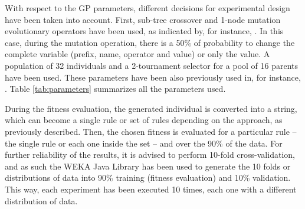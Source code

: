 \documentclass[runningheads]{llncs}
\begin{document}
With respect to the GP parameters, different decisions for experimental design have been taken into account. 
First, sub-tree crossover and 1-node mutation evolutionary operators have
been used, as indicated by, for instance, \cite{EvoStar2014:GPBot}. In this case, during the
mutation operation, there is a 50\% of probability to change the complete variable (prefix, name, operator and value) or only the value. A population of 32 individuals and a 2-tournament selector for a pool of
16 parents have been used. These parameters have been also previously
used in, for instance, \cite{EvoStar2014:GPBot}. Table \ref{tab:parameters} summarizes all the parameters used.
%
\begin{table}
\begin{center}
\caption{Parameters used in the experiments.}
\label{tab:parameters}
\end{center}
\end{table}

During the fitness evaluation, the generated individual is converted
into a string, which can become a single rule or set of rules
depending on the approach, as previously described. %
Then, the chosen fitness is evaluated for a particular rule -- the single rule or each one inside the set -- and over the 90\% of the data.
For further reliability of the results, it is advised to perform
10-fold cross-validation, and as such the WEKA 
Java Library \cite{HallWEKA09} has been used to generate the 10 folds
or distributions of data into 90\% training (fitness evaluation) and
10\% validation. This way, each experiment has been executed 10 times,
each one with a different distribution of data.
\end{document}
